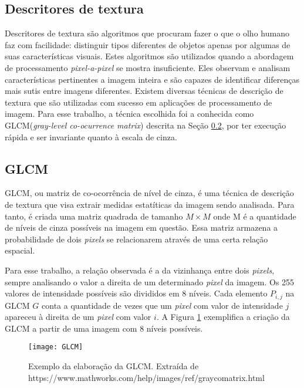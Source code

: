\subsection{Descritores de textura}\label{sec:descritores}

Descritores de textura são algoritmos que procuram fazer o que o olho humano faz com facilidade: distinguir tipos diferentes de objetos apenas por algumas de suas características visuais. Estes algoritmos são utilizados quando a abordagem de processamento \textit{pixel-a-pixel} se mostra insuficiente. Eles observam e analisam características pertinentes a imagem inteira e são capazes de identificar diferenças mais sutis entre imagens diferentes. Existem diversas técnicas de descrição de textura que são utilizadas com sucesso em aplicações de processamento de imagem. Para esse trabalho, a técnica escolhida foi a conhecida como GLCM(\textit{gray-level co-ocurrence matrix}) descrita na Seção \ref{sec:GLCM}, por ter execução rápida e ser invariante quanto à escala de cinza.

\subsection{GLCM}\label{sec:GLCM}

GLCM, ou matriz de co-ocorrência de nível de cinza, é uma técnica de descrição de textura que visa extrair medidas estatíticas da imagem sendo analisada. Para tanto, é criada uma matriz quadrada de tamanho $M\times M$ onde M é a quantidade de níveis de cinza possíveis na imagem em questão. Essa matriz armazena a probabilidade de dois \textit{pixels} se relacionarem através de uma certa relação espacial\cite{GLCM}. 

Para esse trabalho, a relação observada é a da vizinhança entre dois \textit{pixels}, sempre analisando o valor a direita de um determinado \textit{pixel} da imagem. Os 255 valores de intensidade possíveis são divididos em 8 níveis. Cada elemento $P_{i,j}$ na GLCM $G$ conta a quantidade de vezes que um \textit{pixel} com valor de intensidade  $j$ apareceu à direita de um \textit{pixel} com valor $i$. A Figura \ref{fig:GLCM} exemplifica a criação da GLCM a partir de uma imagem com 8 níveis possíveis.

\begin{figure}
\texttt{[image: GLCM]} 
\centering
\caption{Exemplo da elaboração da GLCM. Extraída de https://www.mathworks.com/help/images/ref/graycomatrix.html}
\label{fig:GLCM}
\centering
\end{figure}


